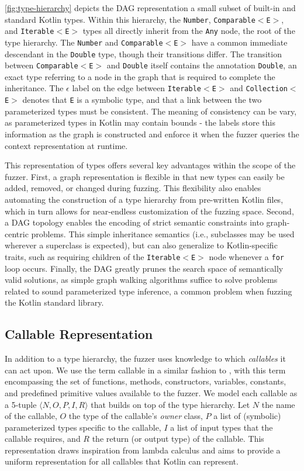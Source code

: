 \autoref{fig:type-hierarchy} depicts the \Gls{DAG} representation
a small subset of built-in and standard Kotlin types.
Within this hierarchy, the \texttt{Number}, \texttt{Comparable$<$E$>$}, 
and \texttt{Iterable$<$E$>$} types all directly inherit from the \texttt{Any} node, 
the root of the type hierarchy.
The \texttt{Number} and \texttt{Comparable$<$E$>$} have a common immediate descendant in the 
\texttt{Double} type, though their transitions differ.
The transition between \texttt{Comparable$<$E$>$} and \texttt{Double} itself
contains the annotation \texttt{Double}, an exact type referring to a node in the graph
that is required to complete the inheritance.
The $\epsilon$ label on the edge between \texttt{Iterable$<$E$>$} and \texttt{Collection$<$E$>$}
denotes that \texttt{E} is a symbolic type, and that a link between the two parameterized types
must be consistent.
The meaning of consistency can be vary, as parameterized types in Kotlin may contain bounds -
the labels store this information as the graph is constructed and enforce it when the fuzzer 
queries the context representation at runtime.

This representation of types offers several key advantages within the scope of the fuzzer.
First, a graph representation is flexible in that new types can easily be added, removed, or changed
during fuzzing.
This flexibility also enables automating the construction of a type hierarchy
from pre-written Kotlin files, which in turn allows for near-endless customization of the fuzzing space.
Second, a \Gls{DAG} topology enables the encoding of strict semantic constraints into
graph-centric problems.
This simple inheritance semantics (i.e., subclasses may be used wherever a superclass is expected),
but can also generalize to Kotlin-specific traits, such as requiring children of the \texttt{Iterable$<$E$>$}
node whenever a \texttt{for} loop occurs.
Finally, the \Gls{DAG} greatly prunes the search space of semantically valid solutions, as simple graph walking
algorithms suffice to solve problems related to sound parameterized type inference, a common problem
when fuzzing the Kotlin standard library.

\subsection{\label{subsec:callables}Callable Representation}
In addition to a type hierarchy, the fuzzer uses knowledge to which \textit{callables}
it can act upon.
We use the term callable in a similar fashion to \citet{stepanov2021type}, with this term encompassing
the set of functions, methods, constructors, variables, constants, and predefined primitive values
available to the fuzzer.
We model each callable as a 5-tuple $\langle N, O, P, I, R \rangle$ that builds on top of the
type hierarchy.
Let $N$ the name of the callable, $O$ the type of the callable's \textit{owner} class,
$P$ a list of (symbolic) parameterized types specific to the callable,
$I$ a list of input types that the callable requires,
and $R$ the return (or output type) of the callable.
This representation draws inspiration from lambda calculus and aims to provide a uniform representation
for all callables that Kotlin can represent.

